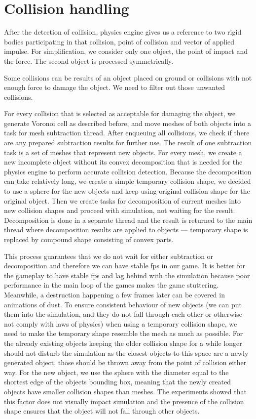 \section{Collision handling}
\label{sec:collisions}
After the detection of collision, physics engine gives us a reference to two rigid bodies participating in that collision, point of collision and vector of applied impulse. For simplification, we consider only one object, the point of impact and the force. The second object is processed symmetrically.

Some collisions can be results of an object placed on ground or collisions with not enough force to damage the object. We need to filter out those unwanted collisions.

For every collision that is selected as acceptable for damaging the object, we generate Voronoi cell as described before, and move meshes of both objects into a task for mesh subtraction thread. After enqueuing all collisions, we check if there are any prepared subtraction results for further use. The result of one subtraction task is a set of meshes that represent new objects. For every mesh, we create a new incomplete object without its convex decomposition that is needed for the physics engine to perform accurate collision detection. Because the decomposition can take relatively long, we create a simple temporary collision shape, we decided to use a sphere for the new objects and keep using original  collision shape for the original object. Then we create tasks for decomposition of current meshes into new collision shapes and proceed with simulation, not waiting for the result. Decomposition is done in a separate thread and the result is returned to the main thread where decomposition results are applied to objects --- temporary shape is replaced by compound shape consisting of convex parts.

This process guarantees that we do not wait for either subtraction or decomposition and therefore we can have stable fps in our game.  It is better for the gameplay to have stable fps and lag behind with the simulation because poor performance in the main loop of the games makes the game stuttering. Meanwhile, a destruction happening a few frames later can be covered in animations of dust. To ensure consistent behaviour of new objects (we can put them into the simulation, and they do not fall through each other or otherwise not comply with laws of physics) when using a temporary collision shape, we need to make the temporary shape resemble the mesh as much as possible.  For the already existing objects keeping the older collision shape for a while longer should not disturb the simulation as the closest objects to this space are a newly generated object, those should be thrown away from the point of collision either way. For the new object, we use the sphere with the diameter equal to the shortest edge of the objects bounding box, meaning that the newly created objects have smaller collision shapes than meshes. The experiments showed that this factor does not visually impact simulation and the presence of the collision shape ensures that the object will not fall through other objects. 


